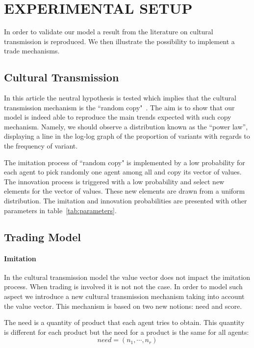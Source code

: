\documentclass{wscpaperproc}
\begin{document}
\section{EXPERIMENTAL SETUP}


In order to validate our model a result from the literature on cultural transmission is reproduced. We then illustrate the possibility to implement a trade mechanisms. 

\subsection{Cultural Transmission}

In this article the neutral hypothesis is tested which implies that the cultural transmission mechanism is the ``random copy"~\cite{bentley_random_2004,bentley_specialisation_2005,mesoudi_random_2009}. The aim is to show that our model is indeed able to reproduce the main trends expected with such copy mechanism. Namely, we should observe a distribution known as the ``power law'', displaying a line in the log-log graph of the proportion of variants with regards to the frequency of variant.

The imitation process of ``random copy" is implemented by a low probability for each agent to pick randomly one agent among all and copy its vector of values. The innovation process is triggered with a low probability and select new elements for the vector of values. These new elements are drawn from a uniform distribution. The imitation and innovation probabilities are presented with other parameters in table~\ref{tab:parameters}.

\subsection{Trading Model}\label{sec:trade}

\paragraph{Imitation}
In the cultural transmission model the value vector does not impact the imitation process. When trading is involved it is not not the case. In order to model such aspect we introduce a new cultural transmission mechanism taking into account the value vector. This mechanism is based on two new notions: need and score. 

The need is a quantity of product that each agent tries to obtain. This quantity is different for each product but the need for a product is the same for all agents:
$$ need = (n_1, \cdots, n_r) $$ 
\end{document}
